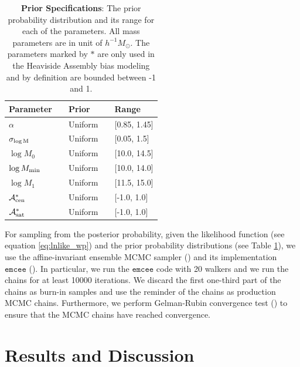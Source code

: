 \documentclass[twocolumn]{aastex61}
\newcommand{\mzero}{\log M_{0}}
\newcommand{\mone}{\log M_{1}}
\newcommand{\mmin}{\log M_{\rm min}}
\newcommand{\sigmam}{\sigma_{\log \rm M}}
\newcommand{\acen}{\mathcal{A}_{\rm cen}}
\newcommand{\asat}{\mathcal{A}_{\rm sat}}
\begin{document}
\begin{table}
\begin{center}
  \label{tab:prior}
  \caption{{\bf Prior Specifications}: The prior probability distribution 
  and its range for each of the parameters. 
  All mass parameters are in unit of $h^{-1}M_\odot$. The parameters marked by $*$ are only used in the Heaviside Assembly bias modeling and by definition are bounded between -1 and 1.}
\begin{tabular}{@{}lllll}
\\ \hline 
    Parameter & & Prior & & Range \\ \hline
  $\alpha$ & & Uniform & & [0.85, 1.45] \\
  $\sigmam$ & & Uniform & &  [0.05, 1.5] \\
  $\mzero$   & & Uniform & &  [10.0, 14.5] \\
  $\mmin$ & &   Uniform & &  [10.0, 14.0] \\
  $\mone$ & & Uniform & & [11.5, 15.0] \\ 
  $\acen^{*}$ & & Uniform & & [-1.0, 1.0] \\
  $\asat^{*}$ & & Uniform & & [-1.0, 1.0] \\
 \hline
  \end{tabular}
\end{center}
\end{table}

For sampling from the posterior probability, given the likelihood function (see equation \ref{eq:lnlike_wp}) and the prior probability distributions (see Table \ref{tab:prior}), we use the affine-invariant ensemble MCMC sampler (\citealt{goodmanweare}) and its implementation $\mathtt{emcee}$ (\citealt{emcee}). In particular, we run the $\mathtt{emcee}$ code with 20 walkers and we run the chains for at least 10000 iterations. We discard the first one-third part of the chains as burn-in samples and use the reminder of the chains as production MCMC chains. Furthermore, we perform Gelman-Rubin convergence test (\citealt{grtest}) to ensure that the MCMC chains have reached convergence.

\section{Results and Discussion}\label{sec:result}
\end{document}
